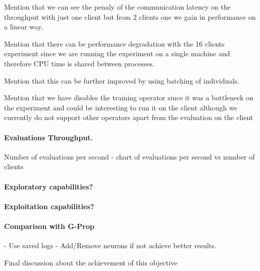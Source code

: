 Mention that we can see the penaly of the communication latency on the throughput with just one client but from 2 clients one we gain in performance on a linear way.

Mention that there can be performance degradation with the 16 clients experiment since we are running the experiment on a single machine and therefore CPU time is shared between processes.

Mention that this can be further improved by using batching of individuals.

Mention that we have disables the training operator since it was a bottleneck on the experiment and could be interesting to run it on the client although we currently do not support other operators apart from the evaluation on the client


\paragraph*{Evaluations Throughput.} Number of evaluations per second - chart of evaluations per second vs number of clients
\paragraph*{Exploratory capabilities?}
\paragraph*{Exploitation capabilities?}
\paragraph*{Comparison with G-Prop} - Use saved logs - Add/Remove neurons if not achieve better results.

Final discussion about the achievement of this objective